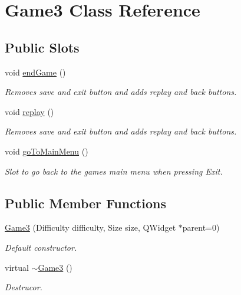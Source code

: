 \hypertarget{classGame3}{\section{\-Game3 \-Class \-Reference}
\label{classGame3}
}
\subsection*{\-Public \-Slots}
\begin{DoxyCompactItemize}
\item 
void \hyperlink{classGame3_a0a79ef23fdfd43052da0e31da7cf8172}{end\-Game} ()
\begin{DoxyCompactList}\small\item\em \-Removes save and exit button and adds replay and back buttons. \end{DoxyCompactList}\item 
void \hyperlink{classGame3_ab37e7d626fddb52e5488caef0e2eb551}{replay} ()
\begin{DoxyCompactList}\small\item\em \-Removes save and exit button and adds replay and back buttons. \end{DoxyCompactList}\item 
void \hyperlink{classGame3_ab5b41e8bcbaf0c2299f1c9c21660867e}{go\-To\-Main\-Menu} ()
\begin{DoxyCompactList}\small\item\em \-Slot to go back to the games main menu when pressing \-Exit. \end{DoxyCompactList}\end{DoxyCompactItemize}
\subsection*{\-Public \-Member \-Functions}
\begin{DoxyCompactItemize}
\item 
\hyperlink{classGame3_a1c9c75bff5b0dcd841ce4eafb9a2b40b}{\-Game3} (\-Difficulty difficulty, \-Size size, \-Q\-Widget $\ast$parent=0)
\begin{DoxyCompactList}\small\item\em \-Default constructor. \end{DoxyCompactList}\item 
virtual \hyperlink{classGame3_afa72d96885beec0fc5f4f542d20a9898}{$\sim$\-Game3} ()
\begin{DoxyCompactList}\small\item\em \-Destrucor. \end{DoxyCompactList}\end{DoxyCompactItemize}


